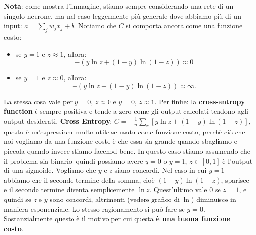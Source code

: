\textbf{Nota}: come mostra l'immagine, stiamo sempre considerando una rete di un singolo neurone, ma nel caso leggermente più generale dove abbiamo più di un input: $a=\sum_jw_jx_j+b$.
\newline
\newline
Notiamo che $C$ si comporta ancora come una funzione costo:
\begin{itemize}
    \item se $y=1$ e $z\approx1$, allora:
        \begin{equation}
            -(y\ln{z}+(1-y)\ln{(1-z)})\approx0
        \end{equation}
    \item se $y=1$ e $z\approx0$, allora:
        \begin{equation}
            -(y\ln{z}+(1-y)\ln{(1-z)})\approx\infty.
        \end{equation}
\end{itemize}
La stessa cosa vale per $y=0$, $z\approx0$ e $y=0$, $z\approx1$.
Per finire: la \textbf{cross-entropy function} è sempre positiva e tende a zero come gli output calcolati tendono agli output desiderati.
\newline
\newline
\textbf{Cross Entropy}: $C=-\frac{1}{n}\sum_x[y\ln{z}+(1-y)\ln{(1-z)}]$, questa è un'espressione molto utile se usata come funzione costo, perchè ciò che noi vogliamo da una funzione costo è che essa sia grande quando sbagliamo e piccola quando invece stiamo facenod bene. In questo caso stiamo assumendo che il problema sia binario, quindi possiamo avere $y=0$ o $y=1$, $z\in[0,1]$ è l'output di una sigmoide. Vogliamo che $y$ e $z$ siano concordi. Nel caso in cui $y=1$ abbiamo che il secondo termine della somma, cioè $(1-y)\ln{(1-z)}$, sparisce e il secondo termine diventa semplicemente $\ln{z}$. Quest'ultimo vale $0$ se $z=1$, e quindi se $z$ e $y$ sono concordi, altrimenti (vedere grafico di $\ln$) diminuisce in maniera esponenziale. Lo stesso ragionamento si può fare se $y=0$. Sostanzialmente questo è il motivo per cui questa \textbf{è una buona funzione costo}. 


